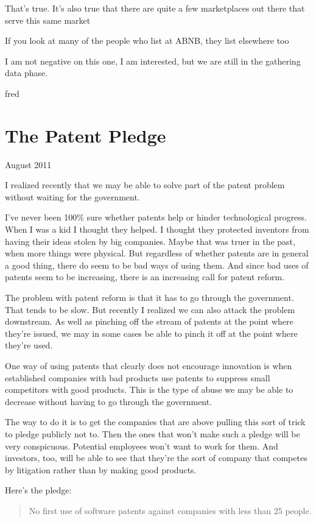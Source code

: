 \documentclass[12pt]{book}
\begin{document}
That's true. It's also true that there are quite a few marketplaces out
there that serve this same market

If you look at many of the people who list at ABNB, they list elsewhere
too

I am not negative on this one, I am interested, but we are still in the
gathering data phase.

fred
\chapter{The Patent Pledge}

August 2011

I realized recently that we may be able to solve part of the patent
problem without waiting for the government.

I've never been 100\% sure whether patents help or hinder technological
progress. When I was a kid I thought they helped. I thought they
protected inventors from having their ideas stolen by big companies.
Maybe that was truer in the past, when more things were physical. But
regardless of whether patents are in general a good thing, there do seem
to be bad ways of using them. And since bad uses of patents seem to be
increasing, there is an increasing call for patent reform.

The problem with patent reform is that it has to go through the
government. That tends to be slow. But recently I realized we can also
attack the problem downstream. As well as pinching off the stream of
patents at the point where they're issued, we may in some cases be able
to pinch it off at the point where they're used.

One way of using patents that clearly does not encourage innovation is
when established companies with bad products use patents to suppress
small competitors with good products. This is the type of abuse we may
be able to decrease without having to go through the government.

The way to do it is to get the companies that are above pulling this
sort of trick to pledge publicly not to. Then the ones that won't make
such a pledge will be very conspicuous. Potential employees won't want
to work for them. And investors, too, will be able to see that they're
the sort of company that competes by litigation rather than by making
good products.

Here's the pledge:

\begin{quote}
No first use of software patents against companies with less than 25
people.
\end{quote}
\end{document}

